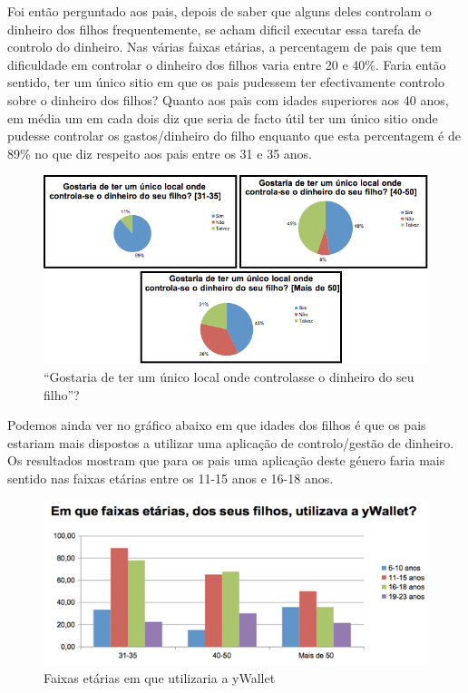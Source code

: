 \documentclass{article}
\begin{document}
      Foi então perguntado aos pais, depois de saber que alguns deles controlam o dinheiro dos filhos frequentemente, se acham dificil executar essa tarefa de controlo do dinheiro. Nas várias faixas etárias, a percentagem de pais que tem dificuldade em controlar o dinheiro dos filhos varia entre 20 e 40\%. Faria então sentido, ter um único sitio em que os pais pudessem ter efectivamente controlo sobre o dinheiro dos filhos? Quanto aos pais com idades superiores aos 40 anos, em média um em cada dois diz que seria de facto útil ter um único sitio onde pudesse controlar os gastos/dinheiro do filho enquanto que esta percentagem é de 89\% no que diz respeito aos pais entre os 31 e 35 anos.

      \begin{figure}[ht!]
        \centering
          \includegraphics[width=0.7\linewidth]{img/img9}
          \caption{``Gostaria de ter um único local onde controlasse o dinheiro do seu filho''?}
          \label{img9}
      \end{figure}

      Podemos ainda ver no gráfico abaixo em que idades dos filhos é que os pais estariam mais dispostos a utilizar uma aplicação de controlo/gestão de dinheiro. Os resultados mostram que para os pais uma aplicação deste género faria mais sentido nas faixas etárias entre os 11-15 anos e 16-18 anos. 

      \begin{figure}[ht!]
        \centering
          \includegraphics[width=0.7\linewidth]{img/img10}
          \caption{Faixas etárias em que utilizaria a yWallet}
          \label{img10}
      \end{figure}
\end{document}
